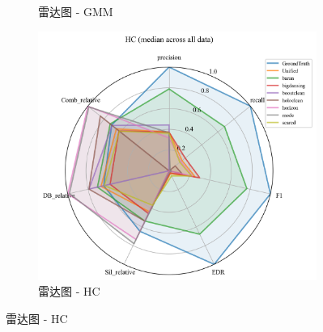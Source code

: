 \documentclass[10pt]{article} %
\numberwithin{equation}{section}
\begin{document}
\begin{enumerate}[label=(\alph*)]
\begin{figure}[htbp]
\begin{subfigure}[b]{0.30\linewidth}
        \caption{雷达图 - GMM}
        \label{fig:radar_gmm}
    \end{subfigure}
    \hfill
    \begin{subfigure}[b]{0.30\linewidth}
        \centering
        \includegraphics[width=\linewidth]{figures/radar graph/radar_HC.png}
        \caption{雷达图 - HC}
        \label{fig:radar_hc}
    \end{subfigure}

    \vspace{1em} %


\end{figure}
\end{enumerate}
\end{document}
